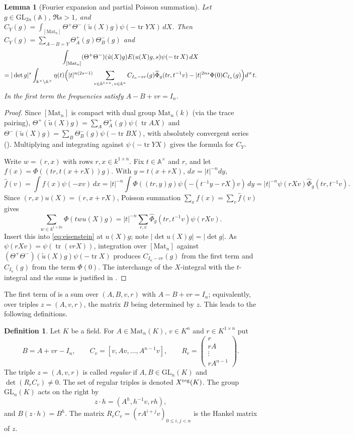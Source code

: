 \documentclass[11pt,oneside,notitlepage]{book}
\numberwithin{equation}{section}
\theoremstyle{plain}
\newtheorem{lemma}[theorem]{Lemma}
\theoremstyle{definition}
\newtheorem{definition}[theorem]{Definition}
\newcommand{\A}{\mathbb{A}}
\newcommand{\GL}{\mathrm{GL}}
\newcommand{\Mat}{\mathrm{Mat}}
\newcommand{\tr}{\operatorname{tr}}
\begin{document}
\begin{lemma}[Fourier expansion and partial Poisson summation]\label{lem:poisson}
	Let $g\in\GL_{2n}(\A)$, $\Re s>1$, and $C_Y(g)=\int_{[\Mat_n]}\Theta^+\Theta^-(\tilde u(X)g)\psi(-\tr YX)\,dX$. Then $C_Y(g)=\sum_{A-B=Y}\Theta^+_A(g)\Theta^-_B(g)$ and
	\begin{multline*}
		\int_{[\Mat_n]}(\Theta^+\Theta^-)(\tilde u(X)g)E(u(X)g,s)\psi(-\tr X)\,dX\\
		=|\det g|^s\int_{k^\times\backslash\A^\times}\eta(t)\Bigl(|t|^{n(2s-1)}\sum_{r\in k^{1\times n},\,v\in k^n}C_{I_n-vr}(g)\widehat\Phi_g(tr,t^{-1}v)-|t|^{2ns}\Phi(0)C_{I_n}(g)\Bigr)d^\times t .
	\end{multline*}
	In the first term the frequencies satisfy $A-B+vr=I_n$.
\end{lemma}
\begin{proof}
	Since $[\Mat_n]$ is compact with dual group $\Mat_n(k)$ (via the trace pairing), $\Theta^+(\tilde u(X)g)=\sum_A\Theta^+_A(g)\psi(\tr AX)$ and $\Theta^-(\tilde u(X)g)=\sum_B\Theta^-_B(g)\psi(-\tr BX)$, with absolutely convergent series (). Multiplying and integrating against $\psi(-\tr YX)$ gives the formula for $C_Y$.
	
	Write $w=(r,x)$ with rows $r,x\in k^{1\times n}$. Fix $t\in\A^\times$ and $r$, and let $f(x)=\Phi((tr,t(x+rX))g)$. With $y=t(x+rX)$, $dx=|t|^{-n}dy$,
	\[\hat f(v)=\int f(x)\psi(-xv)\,dx=|t|^{-n}\int\Phi((tr,y)g)\psi(-(t^{-1}y-rX)v)\,dy=|t|^{-n}\psi(rXv)\widehat\Phi_g(tr,t^{-1}v).\]
	Since $(r,x)u(X)=(r,x+rX)$, Poisson summation $\sum_xf(x)=\sum_v\hat f(v)$ gives
	\[\sum_{w\in k^{1\times2n}}\Phi(twu(X)g)=|t|^{-n}\sum_{r,v}\widehat\Phi_g(tr,t^{-1}v)\psi(rXv).\]
	Insert this into \eqref{eq:eisenstein} at $u(X)g$; note $|\det u(X)g|=|\det g|$. As $\psi(rXv)=\psi(\tr(vrX))$, integration over $[\Mat_n]$ against $(\Theta^+\Theta^-)(\tilde u(X)g)\psi(-\tr X)$ produces $C_{I_n-vr}(g)$ from the first term and $C_{I_n}(g)$ from the term $\Phi(0)$. The interchange of the $X$-integral with the $t$-integral and the sums is justified in .
\end{proof}

The first term of  is a sum over $(A,B,v,r)$ with $A-B+vr=I_n$; equivalently, over triples $z=(A,v,r)$, the matrix $B$ being determined by $z$. This leads to the following definitions.
	\begin{definition}\label{def:regular}
		Let $K$ be a field. For $A\in\Mat_n(K)$, $v\in K^n$ and $r\in K^{1\times n}$ put
		\[B=A+vr-I_n,\qquad C_v=[v,Av,\dots,A^{n-1}v],\qquad R_r=\begin{pmatrix} r\\ rA\\ \vdots\\ rA^{n-1}\end{pmatrix}.\]
		The triple $z=(A,v,r)$ is called \emph{regular} if $A,B\in\GL_n(K)$ and $\det(R_rC_v)\neq0$. The set of regular triples is denoted $X^{\rm reg}(K)$. The group $\GL_n(K)$ acts on the right by
		\[z\cdot h=(A^h,h^{-1}v,rh),\]
		and $B(z\cdot h)=B^h$. The matrix $R_rC_v=(rA^{i+j}v)_{0\le i,j<n}$ is the Hankel matrix of $z$.
	\end{definition}
	
\end{document}
